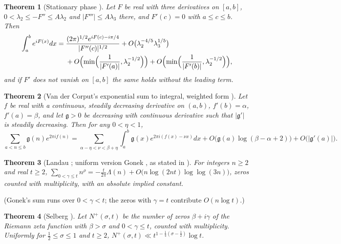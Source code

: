\documentclass[preprint,12pt]{elsarticle}
\numberwithin{equation}{section}
\theoremstyle{plain}
\newtheorem{theorem}{Theorem}[section]
\theoremstyle{definition}
\theoremstyle{remark}
\begin{document}
\begin{theorem}[Stationary phase {\cite[Lemma~4.6]{Titchmarsh1986}}]\label{thm:known_stationary}
Let $F$ be real with three derivatives on $[a,b]$, $0<\lambda_2\le-F''\le A\lambda_2$ and $|F'''|\le A\lambda_3$ there, and $F'(c)=0$ with $a\le c\le b$. Then
\begin{align*}
\int_a^be^{iF(x)}dx={}&\frac{(2\pi)^{1/2}e^{iF(c)-i\pi/4}}{|F''(c)|^{1/2}}+O\bigl(\lambda_2^{-4/5}\lambda_3^{1/5}\bigr)\\
&+O\Bigl(\min\Bigl(\frac1{|F'(a)|},\lambda_2^{-1/2}\Bigr)\Bigr)+O\Bigl(\min\Bigl(\frac1{|F'(b)|},\lambda_2^{-1/2}\Bigr)\Bigr),
\end{align*}
and if $F'$ does not vanish on $[a,b]$ the same holds without the leading term.
\end{theorem}

\begin{theorem}[Van der Corput's exponential sum to integral, weighted form {\cite[Lemma~4.10]{Titchmarsh1986}}]\label{thm:known_vdC_weighted}
Let $f$ be real with a continuous, steadily decreasing derivative on $(a,b)$, $f'(b)=\alpha$, $f'(a)=\beta$, and let $\mathfrak g>0$ be decreasing with continuous derivative such that $|\mathfrak g'|$ is steadily decreasing. Then for any $0<\eta<1$,
\[
\sum_{a<n\le b}\mathfrak g(n)e^{2\pi if(n)}=\sum_{\alpha-\eta<\nu<\beta+\eta}\int_a^b\mathfrak g(x)e^{2\pi i(f(x)-\nu x)}dx+O\bigl(\mathfrak g(a)\log(\beta-\alpha+2)\bigr)+O\bigl(|\mathfrak g'(a)|\bigr).
\]
\end{theorem}

\begin{theorem}[Landau {\cite{Landau1912}}; uniform version Gonek {\cite{Gonek1993}}, as stated in {\cite[(1.1)]{Aryan2022}}]\label{thm:known_landau}
For integers $n\ge2$ and real $t\ge2$, $\sum_{0<\gamma\le t}n^{\rho}=-\frac t{2\pi}\Lambda(n)+O\bigl(n\log(2nt)\log\log(3n)\bigr)$, zeros counted with multiplicity, with an absolute implied constant.
\end{theorem}
(Gonek's sum runs over $0<\gamma<t$; the zeros with $\gamma=t$ contribute $O(n\log t)$.)

\begin{theorem}[Selberg {\cite[Thm.~9.19(C)]{Titchmarsh1986}}]\label{thm:known_density}
Let $N^+(\sigma,t)$ be the number of zeros $\beta+i\gamma$ of the Riemann zeta function with $\beta>\sigma$ and $0<\gamma\le t$, counted with multiplicity. Uniformly for $\frac12\le\sigma\le1$ and $t\ge2$, $N^+(\sigma,t)\ll t^{1-\frac14(\sigma-\frac12)}\log t$.
\end{theorem}
\end{document}
